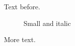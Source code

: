 \documentclass{article}
\begin{document}
Text before.
\begin{figure}[h]
\centering
\caption{Small and italic}
\end{figure}
\begin{table}[h]
\captionsetup{textfont=footnotesize}
\caption{Footnote size text}
\centering
\end{table}
More text.
\end{document}
